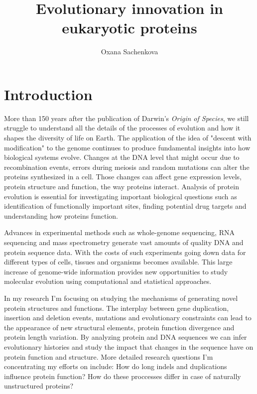 \documentclass[11pt, a4paper,oneside]{report}
\newcommand{\mychapter}[2]{
    \setcounter{chapter}{#1}
    \setcounter{section}{0}
    \chapter*{#2}
    \addcontentsline{toc}{chapter}{#2}
}
\begin{document}
\title{Evolutionary innovation in eukaryotic proteins}
\author{Oxana Sachenkova}
\date{}
\maketitle


\mychapter{0}{Introduction}
More than 150 years after the publication of Darwin's {\itshape Origin of Species}, we still struggle to understand all the details of the processes of evolution and how it shapes the diversity of life on Earth. The application of the idea of "descent with modification" to the genome continues to produce fundamental insights into how biological systems evolve. Changes at the DNA level that might occur due to recombination events, errors during meiosis and random mutations can alter the proteins synthesized in a cell. Those changes can affect gene expression levels, protein structure and function, the way proteins interact. Analysis of protein evolution is essential for investigating important biological questions such as identification of functionally important sites, finding potential drug targets and understanding how proteins function.
  
Advances in experimental methods such as whole-genome sequencing, RNA sequencing and mass spectrometry generate vast amounts of quality DNA and protein sequence data.  With the costs of such experiments going down data for different types of cells, tissues and organisms becomes available. This large increase of genome-wide information provides new opportunities to study molecular evolution using computational and statistical approaches.

In my research I'm focusing on studying the mechanisms of generating novel protein structures and functions. The interplay between gene duplication, insertion and deletion events, mutations and evolutionary constraints can lead to the appearance of new structural elements,  
protein function divergence and protein length variation. By analyzing protein and DNA sequences we can infer evolutionary histories and study the impact that changes in the sequence have on protein function and structure.  More detailed research questions I'm concentrating my efforts on include: How do long indels and duplications influence protein function? How do these proccesses differ in case of naturally unstructured proteins? 
\end{document}
